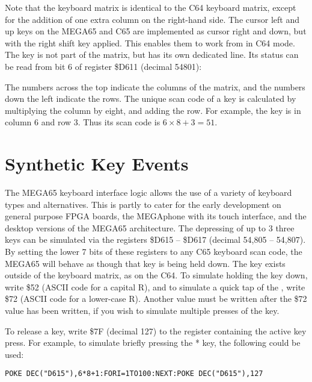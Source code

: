 Note that the keyboard matrix is identical to the C64 keyboard matrix, except for the addition of one extra column
on the right-hand side.  The cursor left and up keys on the MEGA65 and C65 are implemented as cursor right and down, but
with the right shift key applied.  This enables them to work from in C64 mode.  The  key is not
part of the matrix, but has its own dedicated line.  Its status can be read from bit 6 of register \$D611 (decimal 54801):

The numbers across the top indicate the columns of the matrix, and the numbers down the left indicate the rows.
The unique scan code of a key is calculated by multiplying the column by eight, and adding the row.  For example,
the  key is in column 6 and row 3. Thus its scan code is $6 \times 8 + 3 = 51$.

\section{Synthetic Key Events}

The MEGA65 keyboard interface logic allows the use of a variety of keyboard types and alternatives. This is partly
to cater for the early development on general purpose FPGA boards, the MEGAphone with its touch interface, and the
desktop versions of the MEGA65 architecture.  The depressing of up to 3 three keys can be simulated via
the registers \$D615 -- \$D617 (decimal 54,805 -- 54,807).  By setting the
lower 7 bits of these registers to any C65 keyboard scan code, the MEGA65 will behave as though that key is being
held down.  The  key exists outside of the keyboard matrix, as on the C64.  To simulate
holding the  key down, write \$52 (ASCII code for a capital R), and to simulate a quick tap
of the , write \$72 (ASCII code for a lower-case R).  Another value must be written after the
\$72 value has been written, if you wish to simulate multiple presses of the  key.

To release a key, write \$7F (decimal 127) to the register containing the active key press. For example,
to simulate briefly pressing the * key, the following could be used:

\begin{tcolorbox}[colback=black,coltext=white]
\verbatimfont{\codefont}
\begin{verbatim}
POKE DEC("D615"),6*8+1:FORI=1TO100:NEXT:POKE DEC("D615"),127
\end{verbatim}
\end{tcolorbox}

